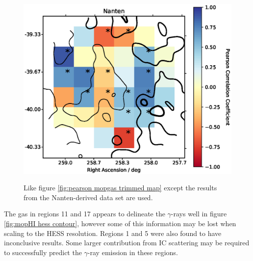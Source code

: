 \documentclass[12pt,a4paper]{article}
\begin{document}
\begin{figure}[H]
	\centering
	\includegraphics[width=1.00\linewidth, height=0.25\textheight]{pearsonmap_gam_nanHI_trimmed}
	\label{fig:corsigmap}
	\caption{Like figure \ref{fig:pearson mopgas trimmed map} except the results from the Nanten-derived data set are used.}
	\label{fig:pearson nangas trimmed map}
\end{figure}


The gas in regions 11 and 17 appears to delineate the $\gamma$-rays well in figure \ref{fig:mopHI hess contour}, however some of this information may be lost when scaling to the HESS resolution. 
Regions 1 and 5 were also found to have inconclusive results.
Some larger contribution from IC scattering may be required to successfully predict the $\gamma$-ray emission in these regions.
\end{document}

